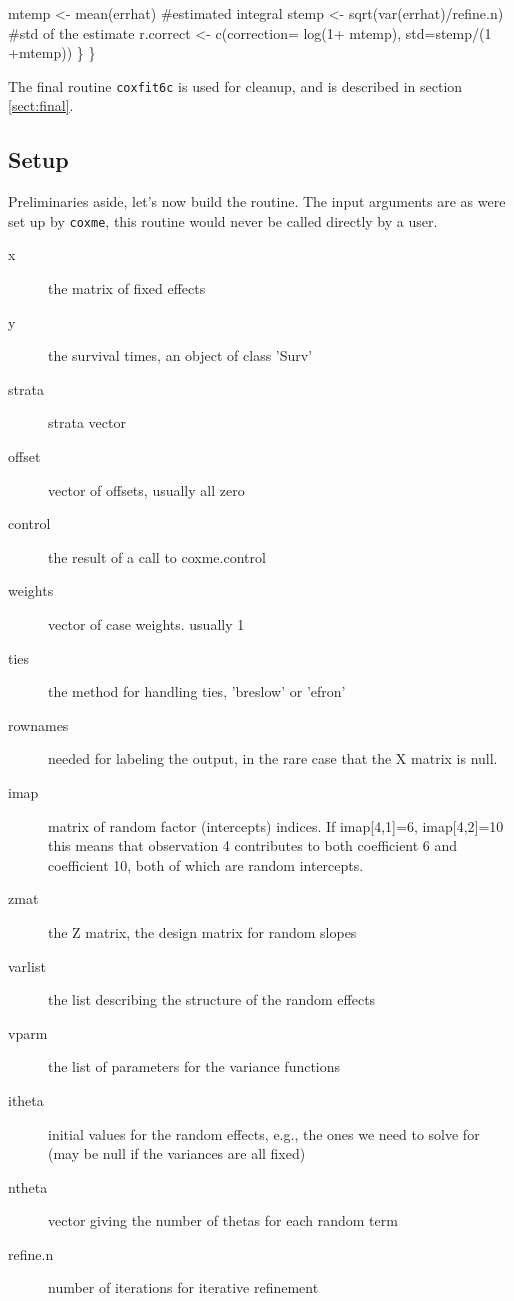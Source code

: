 \documentclass{article}
\begin{document}
\begin{nwchunk}
         mtemp <- mean(errhat)             #estimated integral
         stemp <- sqrt(var(errhat)/refine.n)   #std of the estimate
         r.correct <- c(correction= log(1+ mtemp), std=stemp/(1 +mtemp)) 
     \}
 \}
\end{nwchunk}

The final routine \Verb!coxfit6c! is used for cleanup, and is
described in section \ref{sect:final}.

\subsection{Setup}
Preliminaries aside, let's now build the routine.               %
The input arguments are as were set up by \Verb!coxme!, this
routine would never be called directly by a user.
\begin{description}
  \item[x] the matrix of fixed effects
  \item[y] the survival times, an object of class 'Surv'
  \item[strata] strata vector
  \item[offset] vector of offsets, usually all zero
  \item[control] the result of a call to coxme.control
  \item[weights] vector of case weights. usually 1
  \item[ties] the method for handling ties, 'breslow' or 'efron'
  \item[rownames] needed for labeling the output, in the rare case that
    the X matrix is null.
  \item[imap] matrix of random factor (intercepts) indices.  If imap[4,1]=6,
    imap[4,2]=10 this means that observation 4 contributes to both coefficient
    6 and coefficient 10, both of which are random intercepts.
  \item[zmat] the Z matrix, the design matrix for random slopes
  \item[varlist] the list describing the structure of the random effects
  \item[vparm] the list of parameters for the variance functions
  \item[itheta] initial values for the random effects, e.g., the ones we need
    to solve for  (may be null if the variances are all fixed)
  \item[ntheta] vector giving the number of thetas for each random term
  \item[refine.n] number of iterations for iterative refinement
\end{description}
\end{document}
